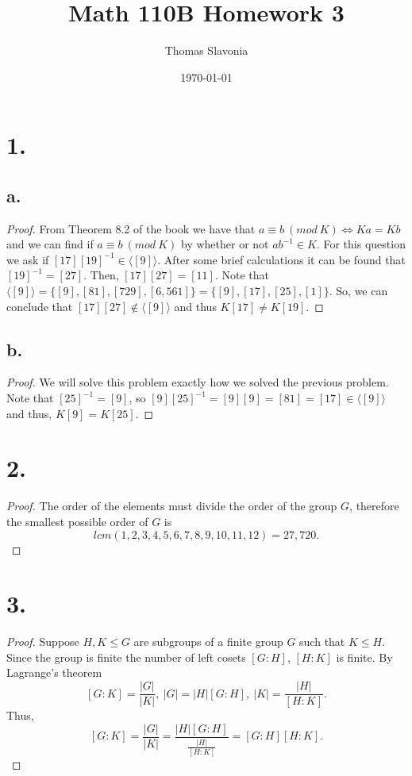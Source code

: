 \documentclass{article}
\title{Math 110B Homework 3}
\author{Thomas Slavonia}
\date{\today}
\begin{document}
\maketitle
\section*{1.}
\subsection*{a.}
\begin{proof}
    From Theorem 8.2 of the book we have that $a \equiv b \ (mod \ K) \iff Ka = Kb$ and we can find if $a \equiv b \ (mod \ K)$ by whether or not $ab^{-1} \in K$. For this question we ask if $[17][19]^{-1} \in \langle[9]\rangle$. After some brief calculations it can be found that $[19]^{-1} = [27]$. Then, $[17][27] = [11]$. 
    Note that $\langle [9] \rangle = \{[9], [81], [729], [6,561] \} = \{[9], [17], [25], [1] \}$. 
    So, we can conclude that $[17][27] \notin \langle [9] \rangle$ and thus $K[17] \neq K [19]$. 

\end{proof}
\subsection*{b.}
\begin{proof}
We will solve this problem exactly how we solved the previous problem. Note that $[25]^{-1} = [9]$, so $[9][25]^{-1} = [9][9] = [81] = [17] \in \langle [9] \rangle$ and thus, $K[9] = K[25]$. 
\end{proof}
\section*{2.}
\begin{proof}
    The order of the elements must divide the order of the group $G$, therefore the smallest possible order of $G$ is
    \[
    lcm(1, 2, 3, 4, 5, 6, 7, 8, 9, 10, 11, 12) = 27, 720.    
    \]
\end{proof}
\section*{3.}
\begin{proof}
Suppose $H, K \leq G$ are subgroups of a finite group $G$ such that $K \leq H$. Since the group is finite the number of left cosets $[G:H]$, $[H:K]$ is finite. By Lagrange's theorem 
\[
    [G: K] = \frac{|G|}{|K|} , \ |G| = |H|[G: H],  \ |K| = \frac{|H|}{[H: K]}.   
\]
Thus, 
\[
 [G: K] = \frac{|G|}{|K|} = \frac{|H|[G: H]}{\frac{|H|}{[H: K]}} = [G:H][H: K].    
\]
\end{proof}
\end{document}
